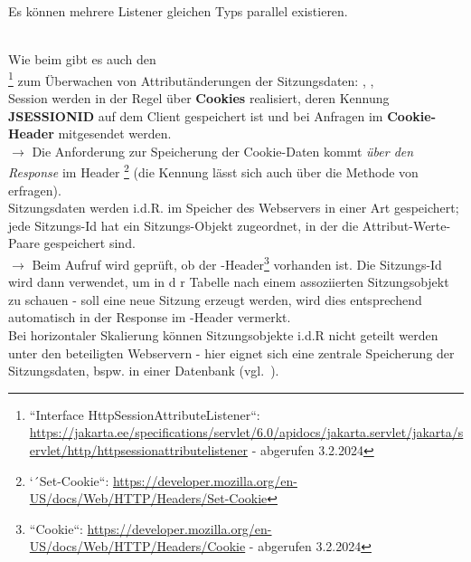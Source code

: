 \begin{tcolorbox}[enlarge top by=0.5cm,enlarge bottom by=0.5cm]
Es können mehrere Listener gleichen Typs parallel existieren.
\end{tcolorbox}\\

\noindent
Wie beim   gibt es auch den\\ \footnote{``Interface HttpSessionAttributeListener``: \url{https://jakarta.ee/specifications/servlet/6.0/apidocs/jakarta.servlet/jakarta/servlet/http/httpsessionattributelistener} - abgerufen 3.2.2024
} zum Überwachen von Attributänderungen der Sitzungsdaten: , , \\

\noindent
Session werden in der Regel über \textbf{Cookies} realisiert, deren Kennung\\ \textbf{JSESSIONID} auf dem Client gespeichert ist und bei Anfragen im \textbf{Cookie-Header} mitgesendet werden.\\
$\rightarrow$ Die Anforderung zur Speicherung der Cookie-Daten kommt \textit{über den Response} im Header \footnote{
    `´Set-Cookie``: \url{https://developer.mozilla.org/en-US/docs/Web/HTTP/Headers/Set-Cookie}
} (die Kennung lässt sich auch über die Methode  von  erfragen).\\

\noindent
Sitzungsdaten werden i.d.R. im Speicher des Webservers in einer Art  gespeichert; jede Sitzungs-Id hat ein Sitzungs-Objekt zugeordnet, in der die Attribut-Werte-Paare gespeichert sind.\\

$\rightarrow$ Beim Aufruf  wird geprüft, ob der -Header\footnote{
    ``Cookie``: \url{https://developer.mozilla.org/en-US/docs/Web/HTTP/Headers/Cookie} - abgerufen 3.2.2024
} vorhanden ist.
Die Sitzungs-Id wird dann verwendet, um in d r Tabelle nach einem assoziierten Sitzungsobjekt zu schauen - soll eine neue Sitzung erzeugt werden, wird dies entsprechend automatisch in der Response im -Header vermerkt.\\

\noindent
Bei horizontaler Skalierung können Sitzungsobjekte i.d.R nicht geteilt werden unter den beteiligten Webservern - hier eignet sich eine zentrale Speicherung der Sitzungsdaten, bspw. in einer Datenbank (vgl.~\cite[433]{Oec22}).

